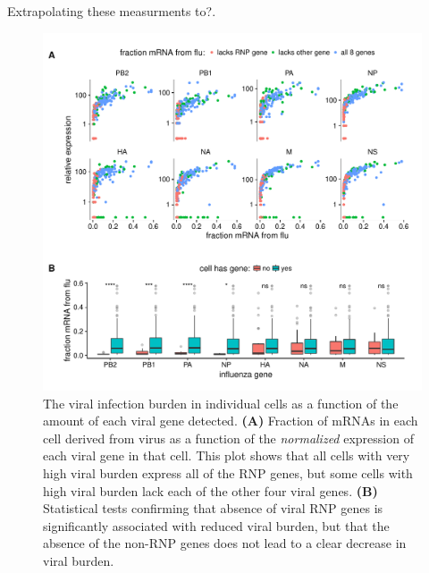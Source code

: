 \documentclass[9pt,lineno]{elife}
\begin{document}
Extrapolating these measurments to?.

\begin{figure}
\includegraphics[width=\linewidth]{figures/p_flu_burden_flu_gene_merge.pdf}
\caption{\label{fig:fluburdenbyflugene}
The viral infection burden in individual cells as a function of the amount of each viral gene detected.
{\bf (A)} 
Fraction of mRNAs in each cell derived from virus as a function of the \emph{normalized} expression of each viral gene in that cell.
This plot shows that all cells with very high viral burden express all of the RNP genes, but some cells with high viral burden lack each of the other four viral genes.
{\bf (B)}
Statistical tests confirming that absence of viral RNP genes is significantly associated with reduced viral burden, but that the absence of the non-RNP genes does not lead to a clear decrease in viral burden.
}
\end{figure}
\end{document}
